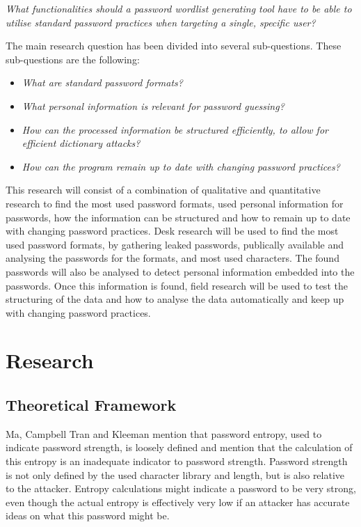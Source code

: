 \documentclass[a4paper,12pt]{article}
\begin{document}
\textit{What functionalities should a password wordlist generating tool have to be able to utilise standard password practices when targeting a single, specific user?}

The main research question has been divided into several sub-questions. These sub-questions are the following:

\begin{itemize}
\item \textit{What are standard password formats?}
\item \textit{What personal information is relevant for password guessing?}
\item \textit{How can the processed information be structured efficiently, to allow for efficient dictionary attacks?}
\item \textit{How can the program remain up to date with changing password practices?}
\end{itemize}

This research will consist of a combination of qualitative and quantitative research to find the most used password formats, used personal information for passwords, how the information can be structured and how to remain up to date with changing password practices. Desk research will be used to find the most used password formats, by gathering leaked passwords, publically available and analysing the passwords for the formats, and most used characters. The found passwords will also be analysed to detect personal information embedded into the passwords. Once this information is found, field research will be used to test the structuring of the data and how to analyse the data automatically and keep up with changing password practices.

\newpage
\section{Research}

\subsection{Theoretical Framework}
Ma, Campbell Tran and Kleeman \cite{bib:entro} mention that password entropy, used to indicate password strength, is loosely defined and mention that the calculation of this entropy is an inadequate indicator to password strength. Password strength is not only defined by the used character library and length, but is also relative to the attacker. Entropy calculations might indicate a password to be very strong, even though the actual entropy is effectively very low if an attacker has accurate ideas on what this password might be.
\end{document}
